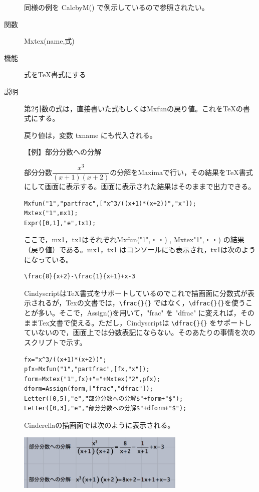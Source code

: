 \documentclass[papersize,a4paper,12pt,uplatex]{jsarticle}
\begin{document}
\begin{description}
同様の例を CalcbyM() で例示しているので参照されたい。

\vspace{\baselineskip}
\hypertarget{mxtex}{}
\item[関数]Mxtex(name,式)
\item[機能]式をTeX書式にする
\item[説明]第2引数の式は，直接書いた式もしくはMxfunの戻り値。これをTeXの書式にする。

戻り値は，変数 txname にも代入される。

\vspace{\baselineskip}
【例】部分分数への分解
\begin{spacing}{1.5}
部分分数$\dfrac{x^3}{(x+1)(x+2)}$の分解をMaximaで行い，その結果をTeX書式にして画面に表示する。画面に表示された結果はそのまま\ketcindy で出力できる。
\end{spacing}
\begin{verbatim}
Mxfun("1","partfrac",["x^3/((x+1)*(x+2))","x"]);
Mxtex("1",mx1);
Expr([0,1],"e",tx1);
\end{verbatim}
ここで，mx1，tx1はそれぞれMxfun("1",・・) , Mxtex"1",・・) の結果（戻り値）である。mx1，tx1 はコンソールにも表示され，tx1は次のようになっている。
\begin{verbatim}
\frac{8}{x+2}-\frac{1}{x+1}+x-3 
\end{verbatim}
CindyscriptはTeX書式をサポートしているのでこれで描画面に分数式が表示されるが，Texの文書では，\verb|\frac{}{}| ではなく，\verb|\dfrac{}{}|を使うことが多い。そこで，Assign()を用いて，"frac" を "dfrac" に変えれば，そのままTex文書で使える。ただし，Cindyscriptは \verb|\dfrac{}{}| をサポートしていないので，画面上では分数表記にならない。そのあたりの事情を次のスクリプトで示す。
\begin{verbatim}
fx="x^3/((x+1)*(x+2))";
pfx=Mxfun("1","partfrac",[fx,"x"]);
form=Mxtex("1",fx)+"="+Mxtex("2",pfx);
dform=Assign(form,["frac","dfrac"]);
Letter([0,5],"e","部分分数への分解$"+form+"$");
Letter([0,3],"e","部分分数への分解$"+dform+"$");
\end{verbatim}
Cinderellaの描画面では次のように表示される。

\vspace{\baselineskip}
\hspace{20mm} \includegraphics[bb=0 0 347.02 116.01 , width=8cm]{Fig/mxtex01.pdf}


\end{description}
\end{document}
